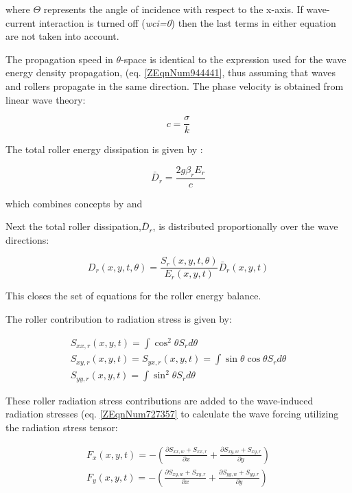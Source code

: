 where $\Theta$ represents the angle of incidence with respect to the x-axis.  If wave-current interaction is turned off (\textit{wci=0}) then the last terms in either equation are not taken into account.

The propagation speed in $\theta $-space is identical to the expression used for the wave energy density propagation, (eq. \eqref{ZEqnNum944441}, thus assuming that waves and rollers propagate in the same direction. The phase velocity is obtained from linear wave theory:

\begin{equation} \label{2.35)} 
c=\frac{\sigma }{k}  
\end{equation} 

The total roller energy dissipation is given by \citep{Reniers2004a}:

\begin{equation} \label{2.36)} 
\bar{D}_{r} =\frac{2g\beta _{r} E_{r} }{c}  
\end{equation} 

which combines concepts by \citet{Deigaard1993} and \citet{Svendsen1984}

Next the total roller dissipation,$\bar{D}_{r} $, is distributed proportionally over the wave directions:

\begin{equation} \label{2.37)} 
D_{r} (x,y,t,\theta )=\frac{S_{r} (x,y,t,\theta )}{E_{r} (x,y,t)} \bar{D}_{r} (x,y,t) 
\end{equation} 

This closes the set of equations for the roller energy balance. 

The roller contribution to radiation stress is given by:

\begin{equation} \label{2.38)} 
\begin{array}{l} {S_{xx,r} (x,y,t)=\int \cos ^{2} \theta S_{r} d\theta  } \\ {S_{xy,r} (x,y,t)=S_{yx,r} (x,y,t)=\int \sin \theta \cos \theta S_{r}  d\theta } \\ {S_{yy,r} (x,y,t)=\int \sin ^{2} \theta S_{r} d\theta  } \end{array} 
\end{equation} 

These roller radiation stress contributions are added to the wave-induced radiation stresses (eq. \eqref{ZEqnNum727357} to calculate the wave forcing utilizing the radiation stress tensor:  

\begin{equation} \label{2.39)} 
\begin{array}{l} {F_{x} (x,y,t)=-\left(\frac{\partial S_{xx,w} +S_{xx,r} }{\partial x} +\frac{\partial S_{xy,w} +S_{xy,r} }{\partial y} \right)} \\ {F_{y} (x,y,t)=-\left(\frac{\partial S_{xy,w} +S_{xy,r} }{\partial x} +\frac{\partial S_{yy,w} +S_{yy,r} }{\partial y} \right)} \end{array} 
\end{equation} 

